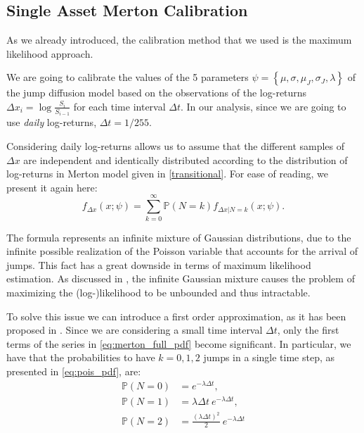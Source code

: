 \subsection{Single Asset Merton Calibration}
As we already introduced, the calibration method that we used is the maximum likelihood approach.

We are going to calibrate the values of the 5 parameters $\psi= \left\{ \mu, \sigma, \mu_J, \sigma_J, \lambda \right\}$ of the jump diffusion model based on the observations of the log-returns $\Delta x_i = \log \frac{S_i}{S_{i-1}}$ for each time interval $\Delta t$. In our analysis, since we are going to use \textit{daily} log-returns, $\Delta t = 1/255$. 

Considering daily log-returns allows us to assume that the different samples of $\Delta x$ are independent and identically distributed according to the distribution of log-returns in Merton model given in \eqref{transitional}.
For ease of reading, we present it again here:
\begin{equation}
\label{eq:merton_full_pdf}
f_{\Delta x } (x; \psi) = \sum_{k=0}^{\infty} \mathbb{P}(N = k) f_{\Delta x | N = k}(x ; \psi) .
\end{equation}

The formula represents an infinite mixture of Gaussian distributions, due to the infinite possible realization of the Poisson variable that accounts for the arrival of jumps. 
This fact has a great downside in terms of maximum likelihood estimation. As discussed in \cite{HONORE1998}, the infinite Gaussian mixture causes the problem of maximizing the (log-)likelihood to be unbounded and thus intractable.

To solve this issue we can introduce a first order approximation, as it has been proposed in \cite{BALLTOROUS1983}. 
Since we are considering a small time interval $\Delta t $, only the first terms of the series in \eqref{eq:merton_full_pdf} become significant. 
In particular, we have that the probabilities to have $k = 0, 1, 2$ jumps in a single time step, as presented in \eqref{eq:pois_pdf}, are:
\begin{subequations}
	\begin{align}
	\mathbb{P}(N = 0) &= e^{-\lambda \Delta t}, \\
	\mathbb{P}(N = 1) &= \lambda \Delta t \: e^{-\lambda \Delta t}, \\
	\mathbb{P}(N = 2) &= \frac{(\lambda \Delta t)^2}{2} \: e^{-\lambda \Delta t}
	\end{align}
\end{subequations}

